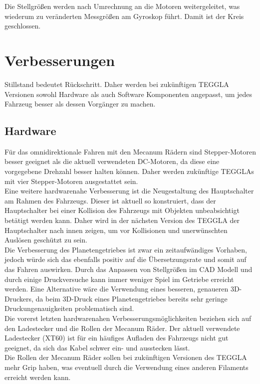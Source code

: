 Die Stellgrößen werden nach Umrechnung an die Motoren weitergeleitet, was wiederum zu veränderten Messgrößen am Gyroskop führt. 
Damit ist der Kreis geschlossen. 


\section{Verbesserungen}
Stillstand bedeutet Rückschritt. Daher werden bei zukünftigen TEGGLA Versionen sowohl Hardware als auch Software Komponenten angepasst, um jedes Fahrzeug besser als dessen Vorgänger zu machen.

\subsection{Hardware}
Für das omnidirektionale Fahren mit den Mecanum Rädern sind Stepper-Motoren besser geeignet als die aktuell verwendeten DC-Motoren, da diese eine vorgegebene Drehzahl besser halten können. Daher werden zukünftige TEGGLAs mit vier Stepper-Motoren ausgestattet sein.\\

Eine weitere hardwarenahe Verbesserung ist die Neugestaltung des Hauptschalter am Rahmen des Fahrzeugs. Dieser ist aktuell so konstruiert, dass der Hauptschalter bei einer Kollision des Fahrzeugs mit Objekten unbeabsichtigt betätigt werden kann. Daher wird in der nächsten Version des TEGGLA der Hauptschalter nach innen zeigen, um vor Kollisionen und unerwünschten Auslösen geschützt zu sein.\\

Die Verbesserung des Planetengetriebes ist zwar ein zeitaufwändiges Vorhaben, jedoch würde sich das ebenfalls positiv auf die Übersetzungsrate und somit auf das Fahren auswirken. Durch das Anpassen von Stellgrößen im CAD Modell und durch einige Druckversuche kann immer weniger Spiel im Getriebe erreicht werden. Eine Alternative wäre die Verwendung eines besseren, genaueren 3D-Druckers, da beim 3D-Druck eines Planetengetriebes bereits sehr geringe Druckungenauigkeiten problematisch sind.\\

Die vorerst letzten hardwarenahen Verbesserungsmöglichkeiten beziehen sich auf den Ladestecker und die Rollen der Mecanum Räder. Der aktuell verwendete Ladestecker (XT60) ist für ein häufiges Aufladen des Fahrzeugs nicht gut geeignet, da sich das Kabel schwer ein- und ausstecken lässt.\\

Die Rollen der Mecanum Räder sollen bei zukünftigen Versionen des TEGGLA mehr Grip haben, was eventuell durch die Verwendung eines anderen Filaments erreicht werden kann.\\


